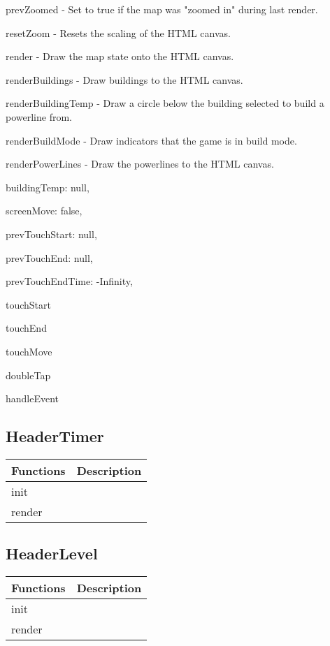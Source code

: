	prevZoomed - Set to true if the map was "zoomed in" during last render.

	resetZoom - Resets the scaling of the HTML canvas.

	render - Draw the map state onto the HTML canvas.

	renderBuildings - Draw buildings to the HTML canvas.

	renderBuildingTemp - Draw a circle below the building selected to build a powerline from.

	renderBuildMode - Draw indicators that the game is in build mode.

	renderPowerLines - Draw the powerlines to the HTML canvas.

	buildingTemp: null,

  	screenMove: false,

  	prevTouchStart: null,

 	prevTouchEnd: null,

  	prevTouchEndTime: -Infinity,

  	touchStart

  	touchEnd

  	touchMove

  	doubleTap

  	handleEvent

\subsection*{HeaderTimer}

	\begin{table}[H]
	\begin{tabular}{p{4cm} | p{8cm} }
	\hline
	\rowcolor{gray}
	Functions & Description \\ \hline
	init & \\ \hline
	render & \\ \hline
	\end{tabular}
	\end{table}

\subsection*{HeaderLevel}

	\begin{table}[H]
	\begin{tabular}{p{4cm} | p{8cm} }
	\hline
	\rowcolor{gray}
	Functions & Description \\ \hline
	init & \\ \hline
	render & \\ \hline
	\end{tabular}
	\end{table}

